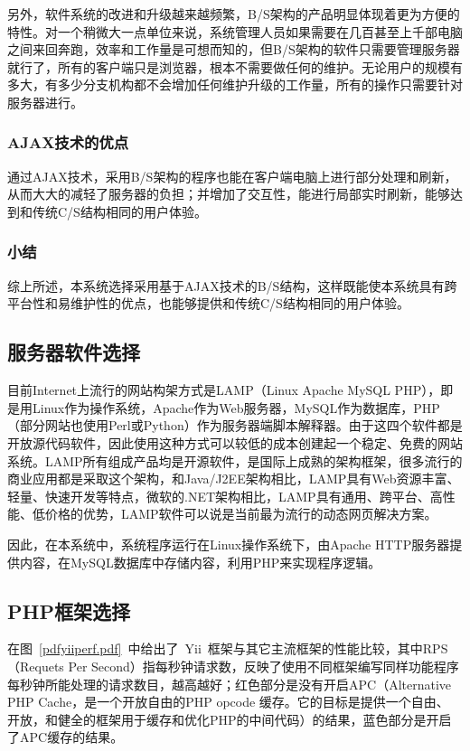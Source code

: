 另外，软件系统的改进和升级越来越频繁，B/S架构的产品明显体现着更为方便的特性。对一个稍微大一点单位来说，系统管理人员如果需要在几百甚至上千部电脑之间来回奔跑，效率和工作量是可想而知的，但B/S架构的软件只需要管理服务器就行了，所有的客户端只是浏览器，根本不需要做任何的维护。无论用户的规模有多大，有多少分支机构都不会增加任何维护升级的工作量，所有的操作只需要针对服务器进行。

\subsubsection{AJAX技术的优点}

通过AJAX技术，采用B/S架构的程序也能在客户端电脑上进行部分处理和刷新，从而大大的减轻了服务器的负担；并增加了交互性，能进行局部实时刷新，能够达到和传统C/S结构相同的用户体验。

\subsubsection{小结}

综上所述，本系统选择采用基于AJAX技术的B/S结构，这样既能使本系统具有跨平台性和易维护性的优点，也能够提供和传统C/S结构相同的用户体验。

\subsection{服务器软件选择}

目前Internet上流行的网站构架方式是LAMP（Linux Apache MySQL PHP），即是用Linux作为操作系统，Apache作为Web服务器，MySQL作为数据库，PHP（部分网站也使用Perl或Python）作为服务器端脚本解释器。由于这四个软件都是开放源代码软件，因此使用这种方式可以较低的成本创建起一个稳定、免费的网站系统。LAMP所有组成产品均是开源软件，是国际上成熟的架构框架，很多流行的商业应用都是采取这个架构，和Java/J2EE架构相比，LAMP具有Web资源丰富、轻量、快速开发等特点，微软的.NET架构相比，LAMP具有通用、跨平台、高性能、低价格的优势，LAMP软件可以说是当前最为流行的动态网页解决方案。

因此，在本系统中，系统程序运行在Linux操作系统下，由Apache HTTP服务器提供内容，在MySQL数据库中存储内容，利用PHP来实现程序逻辑。

\subsection{PHP框架选择}

在图~\ref{pdfyiiperf.pdf}~中给出了~Yii~框架与其它主流框架的性能比较，其中RPS（Requets Per Second）指每秒钟请求数，反映了使用不同框架编写同样功能程序每秒钟所能处理的请求数目，越高越好；红色部分是没有开启APC（Alternative PHP Cache，是一个开放自由的PHP opcode 缓存。它的目标是提供一个自由、 开放，和健全的框架用于缓存和优化PHP的中间代码\cite{phpapc}）的结果，蓝色部分是开启了APC缓存的结果。

